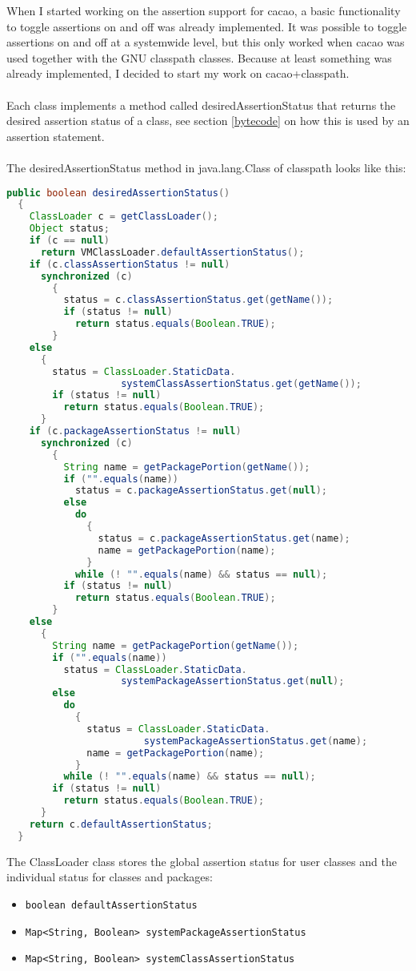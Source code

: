 \documentclass{article}%
\begin{document}
When I started working on the assertion support for cacao, a basic functionality to toggle assertions on and off was already implemented. It was possible to toggle assertions on and off at a systemwide level, but this only worked when cacao was used together with the GNU classpath classes. Because at least something was already implemented, I decided to start my work on cacao+classpath.
\\
\\
Each class implements a method called desiredAssertionStatus that returns the desired assertion status of a class, see section \ref{bytecode} on how this is used by an assertion statement.
\\
\\
The desiredAssertionStatus method in java.lang.Class of classpath looks like this:
\begin{lstlisting}[language=Java,firstnumber=1216]
  public boolean desiredAssertionStatus()
  {
    ClassLoader c = getClassLoader();
    Object status;
    if (c == null)
      return VMClassLoader.defaultAssertionStatus();
    if (c.classAssertionStatus != null)
      synchronized (c)
        {
          status = c.classAssertionStatus.get(getName());
          if (status != null)
            return status.equals(Boolean.TRUE);
        }
    else
      {
        status = ClassLoader.StaticData.
                    systemClassAssertionStatus.get(getName());
        if (status != null)
          return status.equals(Boolean.TRUE);
      }
    if (c.packageAssertionStatus != null)
      synchronized (c)
        {
          String name = getPackagePortion(getName());
          if ("".equals(name))
            status = c.packageAssertionStatus.get(null);
          else
            do
              {
                status = c.packageAssertionStatus.get(name);
                name = getPackagePortion(name);
              }
            while (! "".equals(name) && status == null);
          if (status != null)
            return status.equals(Boolean.TRUE);
        }
    else
      {
        String name = getPackagePortion(getName());
        if ("".equals(name))
          status = ClassLoader.StaticData.
                    systemPackageAssertionStatus.get(null);
        else
          do
            {
              status = ClassLoader.StaticData.
                        systemPackageAssertionStatus.get(name);
              name = getPackagePortion(name);
            }
          while (! "".equals(name) && status == null);
        if (status != null)
          return status.equals(Boolean.TRUE);
      }
    return c.defaultAssertionStatus;
  }
\end{lstlisting}
The ClassLoader class stores the global assertion status for user classes and the individual status for classes and packages:
\begin{itemize}
\item{\verb'boolean defaultAssertionStatus'}
\item{\verb'Map<String, Boolean> systemPackageAssertionStatus'}
\item{\verb'Map<String, Boolean> systemClassAssertionStatus'}
\end{itemize}
\end{document}

